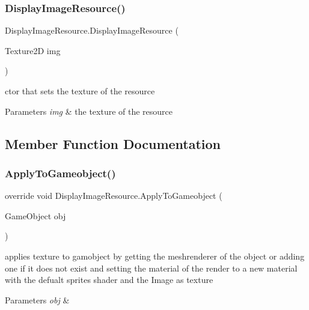\subsubsection{\texorpdfstring{Display\+Image\+Resource()}{DisplayImageResource()}\hspace{0.1cm}{\footnotesize\ttfamily [2/2]}}
{\footnotesize\ttfamily Display\+Image\+Resource.\+Display\+Image\+Resource (\begin{DoxyParamCaption}\item[{Texture2D}]{img }\end{DoxyParamCaption})}



ctor that sets the texture of the resource 


\begin{DoxyParams}{Parameters}
{\em img} & the texture of the resource\\
\hline
\end{DoxyParams}


\subsection{Member Function Documentation}
\mbox{\label{class_display_image_resource_a26992a5ecb6c449d85539cc5d07112e2}} 
\subsubsection{\texorpdfstring{Apply\+To\+Gameobject()}{ApplyToGameobject()}}
{\footnotesize\ttfamily override void Display\+Image\+Resource.\+Apply\+To\+Gameobject (\begin{DoxyParamCaption}\item[{Game\+Object}]{obj }\end{DoxyParamCaption})\hspace{0.3cm}{\ttfamily [virtual]}}



applies texture to gamobject by getting the meshrenderer of the object or adding one if it does not exist and setting the material of the render to a new material with the defualt sprites shader and the Image as texture 


\begin{DoxyParams}{Parameters}
{\em obj} & \\
\hline
\end{DoxyParams}


